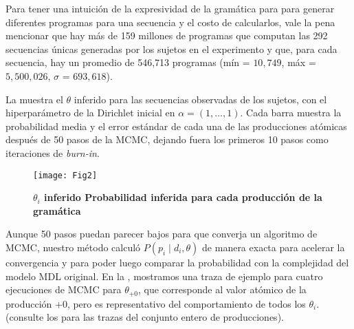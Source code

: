 
Para tener una intuición de la expresividad de la gramática para para generar diferentes programas para una secuencia y el costo de calcularlos, vale la pena mencionar que hay más de 159 millones de programas que computan las 292 secuencias únicas generadas por los sujetos en el experimento y que, para cada secuencia, hay un promedio de 546,713 programas (mín = $10,749$, máx = $5,500,026$, $\sigma$ = $693,618$).


La  muestra el $\theta$ inferido para las secuencias observadas de los sujetos, con el hiperparámetro de la Dirichlet inicial en $\alpha = (1, \dots, 1)$. Cada barra muestra la probabilidad media y el error estándar de cada una de las producciones atómicas después de 50 pasos de la MCMC, dejando fuera los primeros 10 pasos como iteraciones de \textit{burn-in}.

\begin{figure}[htpb]
    \centering
    \texttt{[image: Fig2]}
    \caption{\bf{$\theta_i$ inferido} Probabilidad inferida para cada producción de la gramática}
    \label{fig:inferredtheta}
\end{figure}

Aunque 50 pasos puedan parecer bajos para que converja un algoritmo de MCMC, nuestro método calculó $P(p_i \mid d_i, \theta)$ de manera exacta para acelerar la convergencia y para poder luego comparar la probabilidad con la complejidad del modelo MDL original. En la , mostramos una traza de ejemplo para cuatro ejecuciones de MCMC para $\theta_{\text{+0}}$, que corresponde al valor atómico de la producción +0, pero es representativo del comportamiento de todos los $\theta_i$. (consulte los  para las trazas del conjunto entero de producciones).

